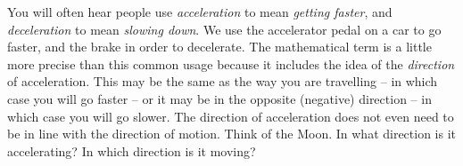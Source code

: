 You will often
hear people use \emph{acceleration} to mean \emph{getting faster}, and
\emph{deceleration} to mean \emph{slowing down}.  We use the
accelerator pedal on a car to go faster, and the brake in order to
decelerate.
The mathematical term is a little more precise than this common usage
because it includes the idea of the \emph{direction} of
acceleration. This may be the same as the way you are travelling -- in
which case you will go faster -- or it may be in the opposite
(negative) direction -- in which case you will go slower.
The direction of acceleration does not even need to be in line with
  the direction of motion. Think of the Moon. In what direction is it
  accelerating? In which direction is it moving?